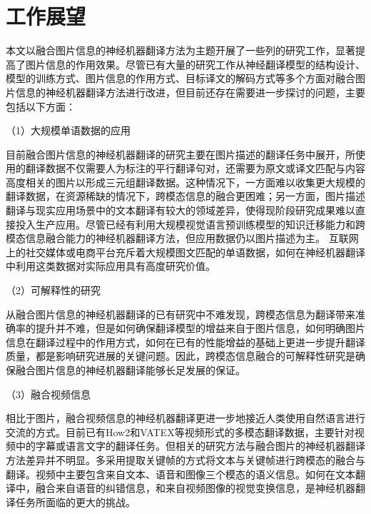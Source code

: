 
\section{工作展望}

本文以融合图片信息的神经机器翻译方法为主题开展了一些列的研究工作，显著提高了图片信息的作用效果。尽管已有大量的研究工作从神经翻译模型的结构设计、模型的训练方式、图片信息的作用方式、目标译文的解码方式等多个方面对融合图片信息的神经机器翻译方法进行改进，但目前还存在需要进一步探讨的问题，主要包括以下方面：

（1）大规模单语数据的应用

目前融合图片信息的神经机器翻译的研究主要在图片描述的翻译任务中展开，所使用的翻译数据不仅需要人为标注的平行翻译句对，还需要为原文或译文匹配与内容高度相关的图片以形成三元组翻译数据。这种情况下，一方面难以收集更大规模的翻译数据，在资源稀缺的情况下，跨模态信息的融合更困难；另一方面，图片描述翻译与现实应用场景中的文本翻译有较大的领域差异，使得现阶段研究成果难以直接投入生产应用。尽管已经有利用大规模视觉语言预训练模型的知识迁移能力和跨模态信息融合能力的神经机器翻译方法，但应用数据仍以图片描述为主。
互联网上的社交媒体或电商平台充斥着大规模图文匹配的单语数据，如何在神经机器翻译中利用这类数据对实际应用具有高度研究价值。

（2）可解释性的研究

从融合图片信息的神经机器翻译的已有研究中不难发现，跨模态信息为翻译带来准确率的提升并不难，但是如何确保翻译模型的增益来自于图片信息，如何明确图片信息在翻译过程中的作用方式，如何在已有的性能增益的基础上更进一步提升翻译质量，都是影响研究进展的关键问题。因此，跨模态信息融合的可解释性研究是确保融合图片信息的神经机器翻译能够长足发展的保证。

（3）融合视频信息

相比于图片，融合视频信息的神经机器翻译更进一步地接近人类使用自然语言进行交流的方式。目前已有How2和VATEX等视频形式的多模态翻译数据，主要针对视频中的字幕或语言文字的翻译任务。但相关的研究方法与融合图片的神经机器翻译方法差异并不明显。多采用提取关键帧的方式将文本与关键帧进行跨模态的融合与翻译。视频中主要包含来自文本、语音和图像三个模态的语义信息。如何在文本翻译中，融合来自语音的纠错信息，和来自视频图像的视觉变换信息，是神经机器翻译任务所面临的更大的挑战。
